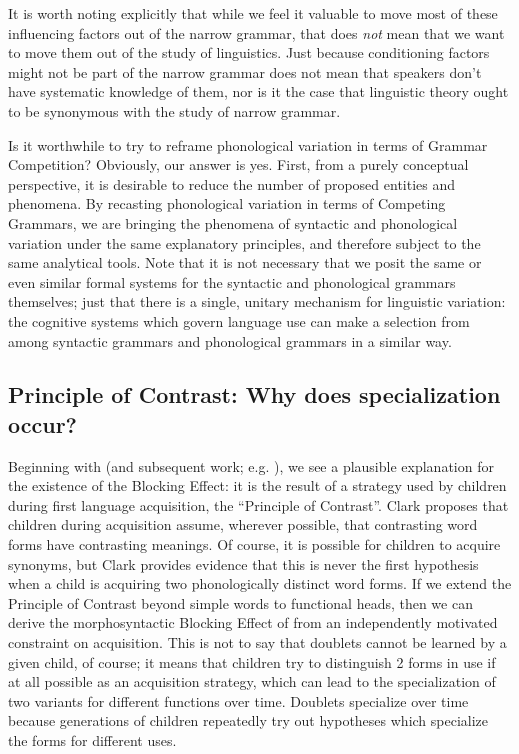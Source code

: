 It is worth noting explicitly that while we feel it valuable to move most of these influencing factors out of the narrow grammar, that does \emph{not} mean that we want to move them out of the study of linguistics. Just because conditioning factors might not be part of the narrow grammar does not mean that speakers don't have systematic knowledge of them, nor is it the case that linguistic theory ought to be synonymous with the study of narrow grammar.
 
Is it worthwhile to try to reframe phonological variation in terms of Grammar Competition?
Obviously, our answer is yes.
First, from a purely conceptual perspective, it is desirable to reduce the number of proposed entities and phenomena.
By recasting phonological variation in terms of Competing Grammars, we are bringing the phenomena of syntactic and phonological variation under the same explanatory principles, and therefore subject to the same analytical tools.
Note that it is not necessary that we posit the same or even similar formal systems for the syntactic and phonological grammars themselves; just that there is a single, unitary mechanism for linguistic variation: the cognitive systems which govern language use can make a selection from among syntactic grammars and phonological grammars in a similar way.






\subsection{Principle of Contrast: Why does specialization occur?}

Beginning with \citet{clark1987} (and subsequent work; e.g. \citealt{clark1990}), we see a plausible explanation for the existence of the Blocking Effect: it is the result of a strategy used by children during first language acquisition, the ``Principle of Contrast''.
Clark proposes that children during acquisition assume, wherever possible, that contrasting word forms have contrasting meanings.
Of course, it is possible for children to acquire synonyms, but Clark provides evidence that this is never the first hypothesis when a child is acquiring two phonologically distinct word forms.
If we extend the Principle of Contrast beyond simple words to functional heads, then we can derive the morphosyntactic Blocking Effect of \citet{kroch1994} from an independently motivated constraint on acquisition.
This is not to say that doublets cannot be learned by a given child, of course; it means that children try to distinguish 2 forms in use if at all possible as an acquisition strategy, which can lead to the specialization of two variants for different functions over time.
Doublets specialize over time because generations of children repeatedly try out hypotheses which specialize the forms for different uses.

